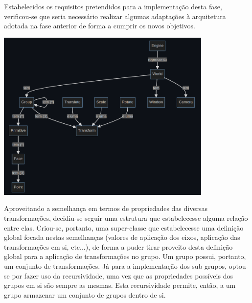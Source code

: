Estabelecidos os requisitos pretendidos para a
implementação desta fase, verificou-se que seria
necessário realizar algumas adaptações à arquitetura
adotada na fase anterior de forma a cumprir os
novos objetivos.
\newline

\begin{center}
    \includegraphics[width=0.8\textwidth]{imgs/concept.png}
    \label{fig:engdom}
\end{center}

\noindent
Aproveitando a semelhança em termos de propriedades das
diversas transformações, decidiu-se seguir uma
estrutura que estabelecesse alguma relação entre elas.
\newline
\break
\noindent
Criou-se, portanto, uma super-classe que estabelecesse
uma definição global focada nestas semelhanças (valores
de aplicação dos eixos, aplicação das transformações em
si, etc...), de forma a puder tirar proveito desta
definição global para a aplicação de transformações
no grupo. Um grupo possui, portanto, um conjunto de
transformações.
\newline
\break
\noindent
Já para a implementação dos sub-grupos, optou-se por
fazer uso da recursividade, uma vez que as propriedades
possíveis dos grupos em si são sempre as mesmas. Esta
recursividade permite, então, a um grupo armazenar um
conjunto de grupos dentro de si.